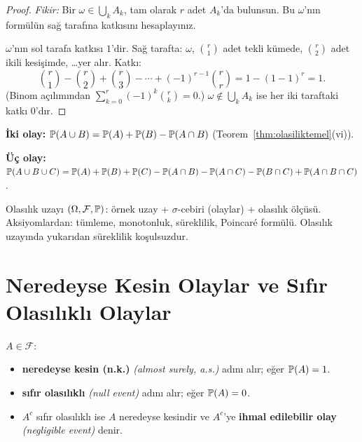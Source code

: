 \begin{proof}
\textit{Fikir:} Bir $\omega \in \bigcup_k A_k$, tam olarak $r$ adet $A_k$'da
bulunsun. Bu $\omega$'nın formülün sağ tarafına katkısını hesaplayınız.

\medskip

$\omega$'nın sol tarafa katkısı $1$'dir. Sağ tarafta: $\omega$, $\binom{r}{1}$
adet tekli kümede, $\binom{r}{2}$ adet ikili kesişimde, \ldots yer alır.
Katkı:
\[
  \binom{r}{1} - \binom{r}{2} + \binom{r}{3} - \cdots + (-1)^{r-1}\binom{r}{r}
  = 1 - (1-1)^r = 1.
\]
(Binom açılımından $\sum_{k=0}^r (-1)^k \binom{r}{k} = 0$.)
$\omega \notin \bigcup_k A_k$ ise her iki taraftaki katkı $0$'dır.
\end{proof}

\begin{ornek}\label{ex:poincare}
\textbf{İki olay:}
$\mathbb{P}(A \cup B) = \mathbb{P}(A) + \mathbb{P}(B) - \mathbb{P}(A \cap B)$ (Teorem~\ref{thm:olasiliktemel}(vi)).

\textbf{Üç olay:}
$\mathbb{P}(A \cup B \cup C) = \mathbb{P}(A) + \mathbb{P}(B) + \mathbb{P}(C)
- \mathbb{P}(A \cap B) - \mathbb{P}(A \cap C) - \mathbb{P}(B \cap C)
+ \mathbb{P}(A \cap B \cap C)$.
\end{ornek}

\begin{mikroozet}[§2.1 özeti]
Olasılık uzayı $(\Omega,\mathcal{F},\mathbb{P})$: örnek uzay + $\sigma$-cebiri (olaylar) +
olasılık ölçüsü. Aksiyomlardan: tümleme, monotonluk, süreklilik, Poincaré formülü.
Olasılık uzayında yukarıdan süreklilik koşulsuzdur.
\end{mikroozet}


\section{Neredeyse Kesin Olaylar ve Sıfır Olasılıklı Olaylar}

\begin{tanim}\label{def:neredeyse_kesin}
$A \in \mathcal{F}$:
\begin{itemize}
  \item \textbf{neredeyse kesin (n.k.)} \emph{(almost surely, a.s.)} adını alır;
        eğer $\mathbb{P}(A) = 1$.
  \item \textbf{sıfır olasılıklı} \emph{(null event)} adını alır;
        eğer $\mathbb{P}(A) = 0$.
  \item $A^c$ sıfır olasılıklı ise $A$ neredeyse kesindir ve $A^c$'ye
        \textbf{ihmal edilebilir olay} \emph{(negligible event)} denir.
\end{itemize}
\end{tanim}

